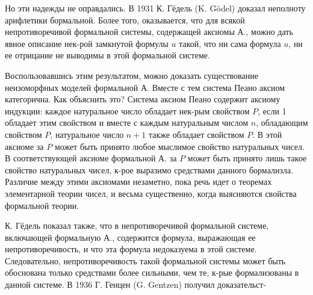 \documentclass[10pt]{article}
\begin{document}
Но эти надежды не оправдались. В 1931 К. Гёдель (K. Gödel) доказал неполноту арифлетики бормальной. Более того, оказывается, что для всякой непротиворечивой формальной системы, содержащей аксиомы А., можно дать явное описание нек-рой замкнутой формулы $u$ такой, что ни сама формула $u$, ни ее отрицание не выводимы в этой формальной системе.



Воспользовавшись этим результатом, можно доказать существование неизоморфных моделей формальной А. Вместе с тем система Пеано аксиом категорична. Как объяснить это? Система аксиом Пеано содержит аксиому индукции: каждое натуральное число обладает нек-рым свойством $P$, если 1 обладает этим свойством и вместе с каждым натуральным числом $n$, обладающим свойством $P$, натуральное число $n+1$ также обладает свойством $P$. В этой аксиоме за $P$ может быть принято любое мыслимое свойство натуральных чисел. В соответствующей аксиоме формальной А. за $P$ может быть принято лишь такое свойство натуральных чисел, к-рое выразимо средствами данного бормализла. Различие между этими аксиомами незаметно, пока речь идет о теоремах элементарной теории чисел, и весьма существенно, когда выясняются свойства формальной теории.



К. Гёдель показал также, что в непротиворечивой формальной системе, включающей формальную А., содержится формула, выражающая ее непротиворечивость, и что эта формула недоказуема в этой системе. Следовательно, непротиворечивость такой формальной системы может быть обоснована только средствами более сильными, чем те, к-рые формализованы в данной системе. В 1936 Г. Генцен (G. Gentzen) получил доказательст-
\end{document}
